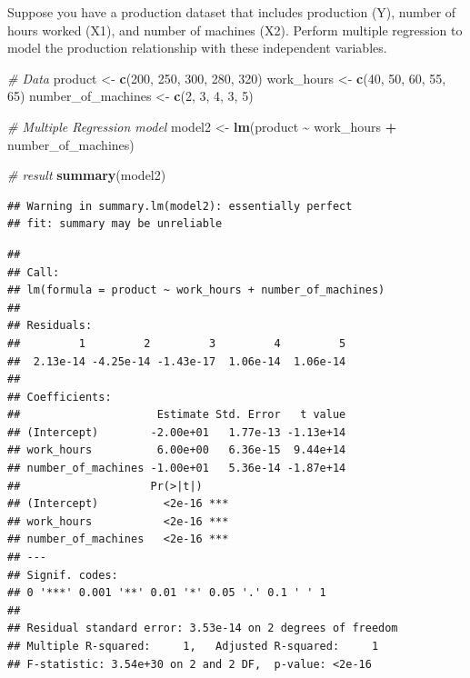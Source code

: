 \documentclass[
]{book}
\newenvironment{Shaded}{\begin{snugshade}}{\end{snugshade}}
\newcommand{\CommentTok}[1]{\textcolor[rgb]{0.56,0.35,0.01}{\textit{#1}}}
\newcommand{\DecValTok}[1]{\textcolor[rgb]{0.00,0.00,0.81}{#1}}
\newcommand{\FunctionTok}[1]{\textcolor[rgb]{0.13,0.29,0.53}{\textbf{#1}}}
\newcommand{\NormalTok}[1]{#1}
\newcommand{\OtherTok}[1]{\textcolor[rgb]{0.56,0.35,0.01}{#1}}
\newcommand{\SpecialCharTok}[1]{\textcolor[rgb]{0.81,0.36,0.00}{\textbf{#1}}}
\begin{document}
Suppose you have a production dataset that includes production (Y), number of hours worked (X1), and number of machines (X2). Perform multiple regression to model the production relationship with these independent variables.

\begin{Shaded}
\begin{Highlighting}[]
\CommentTok{\# Data}
\NormalTok{product }\OtherTok{\textless{}{-}} \FunctionTok{c}\NormalTok{(}\DecValTok{200}\NormalTok{, }\DecValTok{250}\NormalTok{, }\DecValTok{300}\NormalTok{, }\DecValTok{280}\NormalTok{, }\DecValTok{320}\NormalTok{)}
\NormalTok{work\_hours }\OtherTok{\textless{}{-}} \FunctionTok{c}\NormalTok{(}\DecValTok{40}\NormalTok{, }\DecValTok{50}\NormalTok{, }\DecValTok{60}\NormalTok{, }\DecValTok{55}\NormalTok{, }\DecValTok{65}\NormalTok{)}
\NormalTok{number\_of\_machines }\OtherTok{\textless{}{-}} \FunctionTok{c}\NormalTok{(}\DecValTok{2}\NormalTok{, }\DecValTok{3}\NormalTok{, }\DecValTok{4}\NormalTok{, }\DecValTok{3}\NormalTok{, }\DecValTok{5}\NormalTok{)}

\CommentTok{\# Multiple Regression model}
\NormalTok{model2 }\OtherTok{\textless{}{-}} \FunctionTok{lm}\NormalTok{(product  }\SpecialCharTok{\textasciitilde{}}\NormalTok{ work\_hours }\SpecialCharTok{+}\NormalTok{ number\_of\_machines)}

\CommentTok{\# result}
\FunctionTok{summary}\NormalTok{(model2)}
\end{Highlighting}
\end{Shaded}

\begin{verbatim}
## Warning in summary.lm(model2): essentially perfect
## fit: summary may be unreliable
\end{verbatim}

\begin{verbatim}
## 
## Call:
## lm(formula = product ~ work_hours + number_of_machines)
## 
## Residuals:
##         1         2         3         4         5 
##  2.13e-14 -4.25e-14 -1.43e-17  1.06e-14  1.06e-14 
## 
## Coefficients:
##                     Estimate Std. Error   t value
## (Intercept)        -2.00e+01   1.77e-13 -1.13e+14
## work_hours          6.00e+00   6.36e-15  9.44e+14
## number_of_machines -1.00e+01   5.36e-14 -1.87e+14
##                    Pr(>|t|)    
## (Intercept)          <2e-16 ***
## work_hours           <2e-16 ***
## number_of_machines   <2e-16 ***
## ---
## Signif. codes:  
## 0 '***' 0.001 '**' 0.01 '*' 0.05 '.' 0.1 ' ' 1
## 
## Residual standard error: 3.53e-14 on 2 degrees of freedom
## Multiple R-squared:     1,   Adjusted R-squared:     1 
## F-statistic: 3.54e+30 on 2 and 2 DF,  p-value: <2e-16
\end{verbatim}
\end{document}
